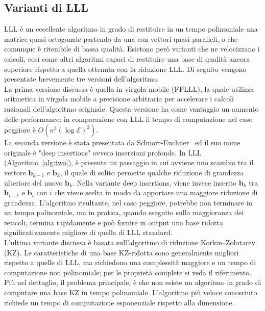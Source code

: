 \subsection{Varianti di LLL}
\label{sec:LLL-variants}
LLL è un eccellente algoritmo in grado di restituire in un tempo polinomiale una matrice 
quasi ortogonale partendo da una con vettori quasi paralleli, o che comunque è ritenibile 
di bassa qualità. Esistono però varianti che ne velocizzano i calcoli, 
così come altri algoritmi capaci di restituire una base di qualità ancora superiore 
rispetto a quella ottenuta con la riduzione LLL. Di seguito vengono presentate 
brevemente tre versioni dell'algoritmo. 
\\
La prima versione discussa è quella in virgola mobile (FPLLL)\cite{FPLLL05}, la quale 
utilizza aritmetica in virgola mobile a 
precisione arbitraria per accelerare i calcoli razionali dell'algoritmo originale. 
Questa versione ha come vantaggio un aumento delle performance: in comparazione con LLL
il tempo di computazione nel caso peggiore è $O(n^3 (\log\mathcal{E})^2)$. 
\\ 
La seconda versione è stata presentata da Schnorr-Euchner~\cite{DEEPLLL94} ed il suo nome
originale è "deep insertions" ovvero inserzioni profonde. In LLL (Algoritmo~\ref*{alg:two}),
è presente un passaggio in cui avviene uno scambio tra il vettore 
$\mathbf{b}_{k-1}$ e $\mathbf{b}_{k}$, il quale di solito permette qualche riduzione di grandezza
ulteriore del nuovo $\mathbf{b}_{k}$. Nella variante deep insertions, viene invece inserito
$\mathbf{b}_{k}$ tra $\mathbf{b}_{i-1}$ e $\mathbf{b}_{i}$ con $i$ che viene scelta in modo
da apportare una maggiore riduzione di grandezza. L'algoritmo risultante, nel caso peggiore,
potrebbe non terminare in un tempo polinomiale, ma in pratica, quando eseguito sulla maggioranza
dei reticoli, termina rapidamente e può fornire in output una base ridotta 
significativamente migliore di quella di LLL standard. 
\\
L'ultima variante discussa è basata sull'algoritmo di riduzione 
Korkin–Zolotarev (KZ)\cite[Sezione 18.5]{Galbraith18}. Le caratteristiche di una base KZ-ridotta
sono generalmente migliori rispetto a quelle di LLL, ma richiedono una complessità maggiore
e un tempo di computazione non polinomiale; per le proprietà complete si veda il riferimento. 
Più nel dettaglio, il problema principale, è che non esiste un algoritmo in grado di computare
una base KZ in tempo polinomiale. L'algoritmo più veloce conosciuto richiede un tempo
di computazione esponenziale rispetto alla dimensione. 
